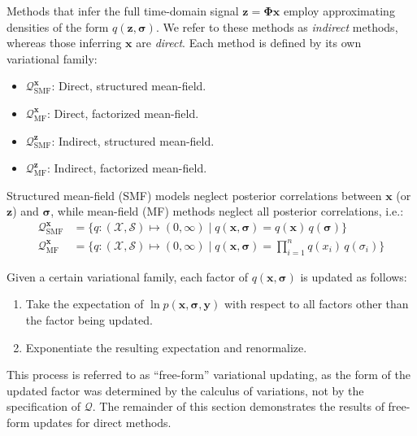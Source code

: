 \documentclass{article}
\newcommand{\m}[1]{\boldsymbol{#1}}
\begin{document}
Methods that infer the full time-domain signal $\m{z} = \m{\Phi} \m{x}$
employ approximating densities of the form $q(\m{z}, \m{\sigma})$. We
refer to these methods as \emph{indirect} methods, whereas those
inferring $\m{x}$ are \emph{direct}. Each method is defined by
its own variational family:
\begin{itemize}
 \item $\mathcal{Q}_{\text{SMF}}^{\m{x}}$: Direct, structured mean-field.
 \item $\mathcal{Q}_{\text{MF}}^{\m{x}}$: Direct, factorized mean-field.
 \item $\mathcal{Q}_{\text{SMF}}^{\m{z}}$: Indirect, structured mean-field.
 \item $\mathcal{Q}_{\text{MF}}^{\m{z}}$: Indirect, factorized mean-field.
\end{itemize}
Structured mean-field (SMF) models neglect posterior correlations between
$\m{x}$ (or $\m{z}$) and $\m{\sigma}$, while mean-field (MF) methods
neglect all posterior correlations, i.e.:
\begin{equation}
\begin{aligned}
\mathcal{Q}_{\text{SMF}}^{\m{x}} &= \big\{
  q : (\mathcal{X}, \mathcal{S}) \mapsto (0, \infty)
 \;\big|\;
  q(\m{x}, \m{\sigma}) = q(\m{x}) \, q(\m{\sigma})
 \big\}
\\
\mathcal{Q}_{\text{MF}}^{\m{x}} &= \big\{
  q : (\mathcal{X}, \mathcal{S}) \mapsto (0, \infty)
 \;\big|\;
  q(\m{x}, \m{\sigma}) = {\textstyle\prod}_{i=1}^n q(x_i) \, q(\sigma_i)
 \big\}
\end{aligned}
\label{eq:smf_mf}
\end{equation}

Given a certain variational family, each factor of $q(\m{x}, \m{\sigma})$
is updated as follows:
\begin{enumerate}
 \item Take the expectation of $\ln p(\m{x}, \m{\sigma}, \m{y})$ with
  respect to all factors other than the factor being updated.
 \item Exponentiate the resulting expectation and renormalize.
\end{enumerate}
This process is referred to as ``free-form'' variational updating, as the
form of the updated factor was determined by the calculus of variations,
not by the specification of $\mathcal{Q}$. The remainder of this section
demonstrates the results of free-form updates for direct methods.

\end{document}
